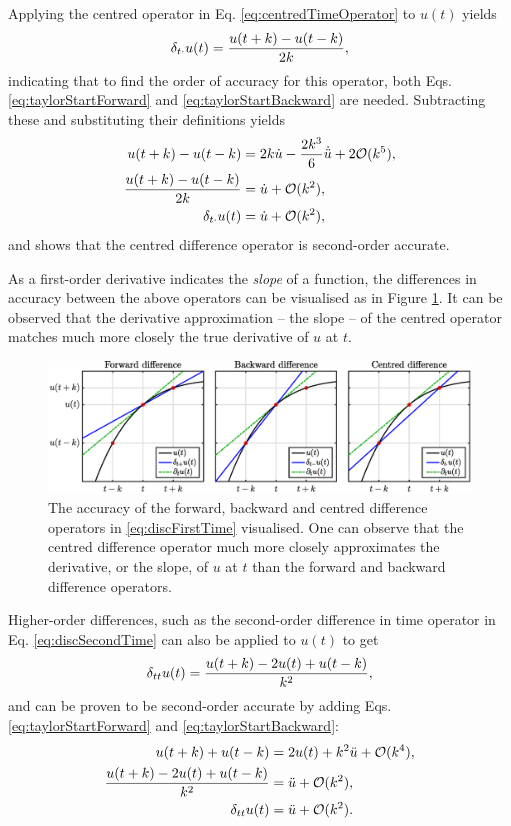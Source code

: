 Applying the centred operator in Eq. \eqref{eq:centredTimeOperator} to $u(t)$ yields
\begin{equation}
    \delta_{t\cdot} u(t) = \frac{u(t+k) - u(t-k)}{2k},
\end{equation}
indicating that to find the order of accuracy for this operator, both Eqs. \eqref{eq:taylorStartForward} and \eqref{eq:taylorStartBackward} are needed. Subtracting these and substituting their definitions yields
\begin{align}
    u(t+k) - u(t-k) &= 2k\dot u - \frac{2k^3}{6}\dot{\ddot{u}} + 2\mathcal{O}(k^5),\nonumber\\
    \frac{u(t+k) - u(t-k)}{2k} &= \dot u + \mathcal{O}(k^2),\nonumber\\
    \delta_{t\cdot} u(t) &= \dot u + \mathcal{O}(k^2),
\end{align}
and shows that the centred difference operator is second-order accurate. 

As a first-order derivative indicates the \textit{slope} of a function, the differences in accuracy between the above operators can be visualised as in Figure \ref{fig:taylor}. It can be observed that the derivative approximation -- the slope -- of the centred operator matches much more closely the true derivative of $u$ at $t$.

\begin{figure}[h]
    \includegraphics[width=\textwidth]{figures/fdtd/taylor.eps}
    \caption{\label{fig:taylor} The accuracy of the forward, backward and centred difference operators in \eqref{eq:discFirstTime} visualised. One can observe that the centred difference operator much more closely approximates the derivative, or the slope, of $u$ at $t$ than the forward and backward difference operators.}
\end{figure}

Higher-order differences, such as the second-order difference in time operator in Eq. \eqref{eq:discSecondTime} can also be applied to $u(t)$ to get
\begin{equation}
    \delta_{tt} u(t) =  \frac{u(t+k) - 2u(t) + u(t-k)}{k^2},
\end{equation}
and can be proven to be second-order accurate by adding Eqs. \eqref{eq:taylorStartForward} and \eqref{eq:taylorStartBackward}:
\begin{align}
    u(t+k) + u(t-k) &= 2 u(t) + k^2 \ddot u + \mathcal{O}(k^4),\nonumber\\
    \frac{u(t+k) -2 u(t) + u(t-k)}{k^2} &= \ddot u + \mathcal{O}(k^2),\nonumber\\
    \delta_{tt} u(t) &= \ddot u + \mathcal{O}(k^2).
\end{align}

